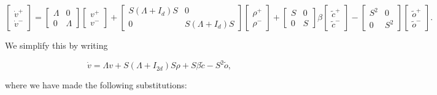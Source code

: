\begin{enumerate}
$$
\begin{bmatrix}\dot{v}^+\\ \dot{v}^-\end{bmatrix} = \begin{bmatrix}
\Lambda & 0
\\
0 & \Lambda 
\end{bmatrix}
\begin{bmatrix} v^+ \\ v^- \end{bmatrix}
 +
\begin{bmatrix}
S \left(\Lambda + I_{d} \right) S & 0 
\\
0 & S \left(\Lambda + I_{d} \right) S 
\end{bmatrix}
\begin{bmatrix}
  \rho^+
  \\
  \rho^-
\end{bmatrix}
  +
\begin{bmatrix}
S & 0 \\ 0 & S
\end{bmatrix}  
\beta 
\begin{bmatrix}
\tilde{c}^+
\\
\tilde{c}^-
\end{bmatrix}
  - 
 \begin{bmatrix}
S^2 & 0
\\
0 & S^2
\end{bmatrix}
\begin{bmatrix}
    \tilde{o}^+
    \\
    \tilde{o}^-
\end{bmatrix}
.
$$

We simplify this by writing 

$$
   \dot{v}
= 
\Lambda 
v +
S \left(\Lambda + I_{2d} \right) S 
  \rho
  +
S 
\beta \tilde{c}
  - 
S^2 
    \tilde{o}, 
$$


where we have made the following substitutions: 


\end{enumerate}
